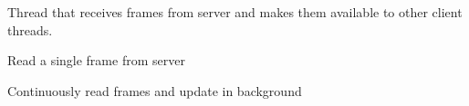 \documentclass[letterpaper,10pt,english]{sphinxmanual}
\begin{document}
\begin{fulllineitems}
\label{\detokenize{index:client.LiveFeed}}
Thread that receives frames from server and makes them available to other client threads.

\begin{fulllineitems}
\label{\detokenize{index:client.LiveFeed.read}}
Read a single frame from server

\end{fulllineitems}


\begin{fulllineitems}
\label{\detokenize{index:client.LiveFeed.run}}
Continuously read frames and update in background

\end{fulllineitems}


\end{fulllineitems}

\end{document}
